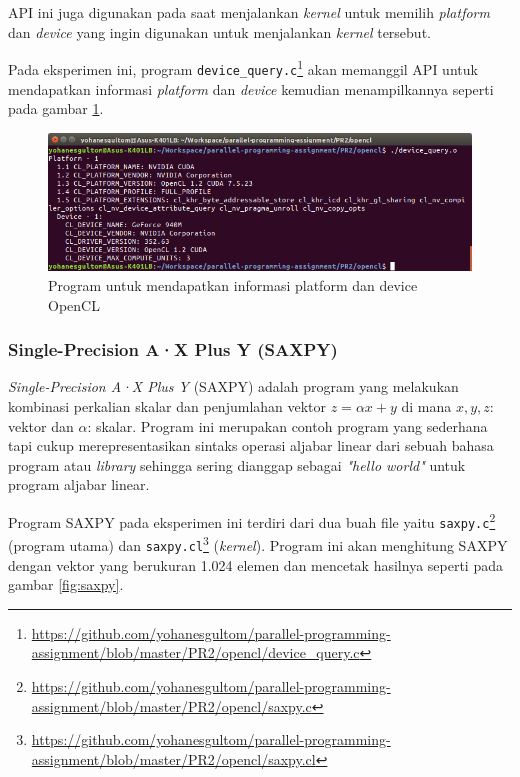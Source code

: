 API ini juga digunakan pada saat menjalankan \textit{kernel} untuk memilih \textit{platform} dan \textit{device} yang ingin digunakan untuk menjalankan \textit{kernel} tersebut.

Pada eksperimen ini, program \verb|device_query.c|\footnote{\url{https://github.com/yohanesgultom/parallel-programming-assignment/blob/master/PR2/opencl/device_query.c}} akan memanggil API untuk mendapatkan informasi \textit{platform} dan \textit{device} kemudian menampilkannya seperti pada gambar \ref{fig:device_query}.

\begin{figure}
	\centering
	\includegraphics[width=1.0\textwidth]
	{pics/device_query.png}
	\caption{Program untuk mendapatkan informasi platform dan device OpenCL}
	\label{fig:device_query}
\end{figure}

\subsubsection{Single-Precision A·X Plus Y (SAXPY)}

\textit{Single-Precision A·X Plus Y} (SAXPY) adalah program yang melakukan kombinasi perkalian skalar dan penjumlahan vektor $z = \alpha x + y$ di mana $x, y, z$: vektor dan $\alpha$: skalar. Program ini merupakan contoh program yang sederhana tapi cukup merepresentasikan sintaks operasi aljabar linear dari sebuah bahasa program atau \textit{library} sehingga sering dianggap sebagai \textit{"hello world"} untuk program aljabar linear. 

Program SAXPY pada eksperimen ini terdiri dari dua buah file yaitu \verb|saxpy.c|\footnote{\url{https://github.com/yohanesgultom/parallel-programming-assignment/blob/master/PR2/opencl/saxpy.c}} (program utama) dan \verb|saxpy.cl|\footnote{\url{https://github.com/yohanesgultom/parallel-programming-assignment/blob/master/PR2/opencl/saxpy.cl}} (\textit{kernel}). Program ini akan menghitung SAXPY dengan vektor yang berukuran 1.024 elemen dan mencetak hasilnya seperti pada gambar \ref{fig:saxpy}.


